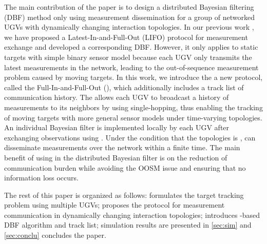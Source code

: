 	The main contribution of the paper is to design a distributed Bayesian filtering (DBF) method only using measurement dissemination for a group of networked UGVs with dynamically changing interaction topologies. 
	In our previous work \cite{liu2016distributed}, we have proposed a Latest-In-and-Full-Out (LIFO) protocol for measurement exchange and developed a corresponding DBF.
	However, it only applies to static targets with simple binary sensor model because each UGV only transmits the latest measurements in the network, leading to the out-of-sequence measurement problem caused by moving targets.
	In this work, we introduce the a new protocol, called the Full-In-and-Full-Out (\proto), which additionally includes a track list of communication history.
	The {\proto} allows each UGV to broadcast a history of measurements to its neighbors by using single-hopping, thus enabling the tracking of moving targets with more general sensor models under time-varying topologies.
	An individual Bayesian filter is implemented locally by each UGV after exchanging observations using \proto.
	Under the condition that the topologies is \fc, {\proto} can disseminate measurements over the network within a finite time.
	The main benefit of using {\proto} in the distributed Bayesian filter is on the reduction of communication burden while avoiding the OOSM issue and ensuring that no information loss occurs.
	
	The rest of this paper is organized as follows: 
	 formulates the target tracking problem using multiple UGVs;
	 proposes the {\proto} protocol for measurement communication in dynamically changing interaction topologies;
	 introduces \proto-based DBF algorithm and track list;
	simulation results are presented in \cref{sec:sim} and \cref{sec:conclu} concludes the paper.